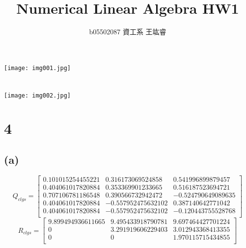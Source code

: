 \documentclass{article}
\title{Numerical Linear Algebra HW1}
\date{}
\author{b05502087 資工系 王竑睿}
\begin{document}
    \maketitle
    \section*{}
    \texttt{[image: img001.jpg]}
    \section*{}
    \texttt{[image: img002.jpg]}
    \newpage
    \section*{4}
        \subsection*{(a)}
            \begin{equation*}
                Q_{clgs} = \left[
                \begin{array}{ccc}
                    0.101015254455221 &  0.316173069524858 &  0.541996899879457\\
                    0.404061017820884 &  0.353369901233665 &  0.516187523694721\\
                    0.707106781186548 &  0.390566732942472 & -0.524790649089635\\
                    0.404061017820884 & -0.557952475632102 &  0.387140642771042\\
                    0.404061017820884 & -0.557952475632102 & -0.120443755528768\\
                \end{array}
                \right]
            \end{equation*}
            \begin{equation*}
                R_{clgs} = \left[    
                \begin{array}{ccc}
                    9.899494936611665 &  9.495433918790781 &  9.697464427701224\\
                    0 &  3.291919606229403 &  3.012943368413355\\
                    0 &                  0 &  1.970115715434855\\
                \end{array}
                \right]
            \end{equation*}
\end{document}
